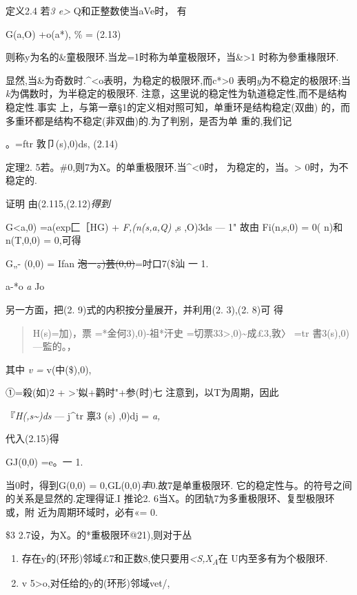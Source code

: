 \documentclass{article}
\begin{document}
定义2.4 若\emph{3 e\textgreater{}}
Q和正整数使当\textbar{}a\textbar{}Ve时， 有

G(a,O) +o(\textbar{}a\textbar{}*), \% = (2.13)

则称y为名的\&童极限环.当龙=1时称为单童极限环，当\&\textgreater{}1
时称为參重椽限环.

显然,当\&为奇数时.\^{}\textless{}o表明，为稳定的极限环,而c*\textgreater{}0
表明\emph{y}为不稳定的极限环;当\emph{k}为偶数时，为半稳定的极限环.
注意，这里说的稳定性为轨道稳定性,而不是结构稳定性.事实
上，与第一章§1的定义相对照可知，单重环是结构稳定(双曲)
的，而多重环都是结构不稳定(非双曲)的.为了判别，是否为单 重的,我们记

。=ftr 敦卩(s),0)ds, (2.14)

定理2. 5若。\#0,则7为X。的单重极限环.当\^{}\textless{}0时，
为稳定的，当。\textgreater{} 0时，为不稳定的.

证明 由(2.115,(2.12)\emph{得到}

G\textless{}a,0) =a(exp匚［HG) + \emph{F,(n(s,a,Q)} ,s ,O)3ds --- 1"
故由 Fi(n,s,0) = 0( \textbar{}n\textbar{})和 n(T,0,0) = 0,可得

G„- (0,0) = Ifan \sout{泡}一\sout{。)芸(0,0)}=吋口7(\$汕 一 1.

a-*o \emph{a} Jo

另一方面，把(2. 9)式的内积按分量展开，并利用(2. 3),(2. 8)可 得

\begin{quote}
H(s)=加)，票 =*金何3),0)-祖*汗史
=切票33\textgreater{},0)\textasciitilde{}成£3,敦〉 =tr
書3(s),0)---監的。\textbar{}，
\end{quote}

其中 \emph{v =} v(中(\$),0),

①=殺(如)2 + \textbar{}\textgreater{}'姒+鹳时"+参(时)七
注意到，以T为周期，因此

『\emph{H(,s\textasciitilde{})ds} --- j\^{}tr 禀3 (s) ,0)dj = \emph{a,}

代入(2.15)得

GJ(0,0) =e。一 1.

当0时，得到G(0,0) = 0,GL(0,0)\emph{丰}0.故7是单重极限环.
它的稳定性与。的符号之间的关系是显然的.定理得证.I 推论2.
6当X。的团轨7为多重极限环、复型极限环或，附 近为周期环域时，必有«= 0.

\$3 2.7设，为X。的*重极限环@21),则对于丛

\begin{enumerate}
\def\labelenumi{(\arabic{enumi})}
\item
  存在y的(环形)邻域£7和正数8,使只要\textbar{}用\emph{\textless{}S,X\textsubscript{A}}在
  U内至多有为个极限环.
\item
  v 5\textgreater{}o,对任给的y的(环形)邻域vet/,
\end{enumerate}
\end{document}
